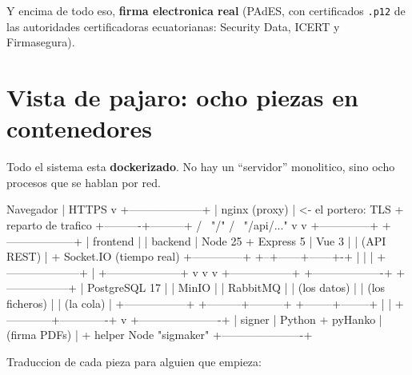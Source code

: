 \documentclass[11pt,a4paper,oneside]{report}
\newcommand{\rt}[1]{\texttt{#1}}
\begin{document}
Y encima de todo eso, \textbf{firma electronica real} (PAdES, con certificados \rt{.p12} de
las autoridades certificadoras ecuatorianas: Security Data, ICERT y Firmasegura).

\chapter{Vista de pajaro: ocho piezas en contenedores}

Todo el sistema esta \textbf{dockerizado}. No hay un ``servidor'' monolitico, sino ocho
procesos que se hablan por red.

\begin{diagrama}
                        Navegador
                            | HTTPS
                            v
                  +--------------------+
                  |   nginx (proxy)    |  <- el portero: TLS + reparto de trafico
                  +----------+---------+
                     /                \
              "/"   /                  \  "/api/..."
                   v                    v
          +--------------+     +------------------+
          |   frontend   |     |     backend      |  Node 25 + Express 5
          |    Vue 3     |     |    (API REST)    |  + Socket.IO (tiempo real)
          +--------------+     +--+------+------+-+
                                  |      |      |
             +--------------------+      |      +--------------------+
             v                           v                           v
    +-----------------+       +-------------------+       +-----------------+
    |  PostgreSQL 17  |       |       MinIO       |       |    RabbitMQ     |
    |  (los datos)    |       |  (los ficheros)   |       |   (la cola)     |
    +-----------------+       +---------+---------+       +--------+--------+
                                        |                          |
                                        +------------+-------------+
                                                     v
                                          +----------------------+
                                          |        signer        |  Python + pyHanko
                                          |     (firma PDFs)     |  + helper Node "sigmaker"
                                          +----------------------+
\end{diagrama}

Traduccion de cada pieza para alguien que empieza:
\end{document}

